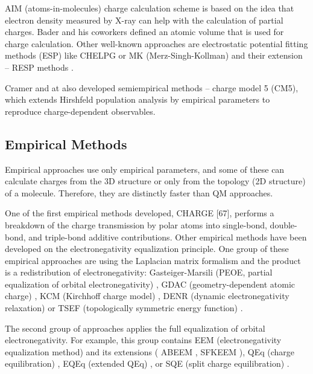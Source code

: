 AIM (atoms-in-molecules) charge calculation scheme is based on the idea that
electron density measured by X-ray can help with the calculation of partial
charges. Bader and his coworkers \cite{Bader1985, Bader1991} defined an atomic
volume that is used for charge calculation. Other well-known approaches are
electrostatic potential fitting methods (ESP) like CHELPG \cite{Breneman1990}
or MK (Merz-Singh-Kollman) \cite{Besler1990} and their extension -- RESP
methods \cite{Woods2015}.

Cramer and at \cite{Marenich2009} also developed semiempirical methods -- charge
model 5 (CM5), which extends Hirshfeld population analysis by empirical
parameters to reproduce charge-dependent observables. 

\subsection{Empirical Methods}

Empirical approaches use only empirical parameters, and some of these can
calculate charges from the 3D structure or only from the topology (2D structure)
of a molecule. Therefore, they are distinctly faster than QM approaches. 

One of the first empirical methods developed, CHARGE [67], performs a breakdown
of the charge transmission by polar atoms into single-bond, double-bond, and 
triple-bond additive contributions. Other empirical methods have been developed
on the electronegativity equalization principle. One group of these empirical
approaches are using the Laplacian matrix formalism and the product is
a redistribution of electronegativity: Gasteiger-Marsili (PEOE, partial
equalization of orbital electronegativity) \cite{Cho2001, Oliferenko2006},
GDAC (geometry-dependent atomic charge) \cite{Shulga2008}, KCM (Kirchhoff charge
model) \cite{Rappe1991}, DENR (dynamic electronegativity
relaxation) \cite{Nistor2006} or TSEF (topologically symmetric energy
function) \cite{Nistor2006}.


The second group of approaches applies the full equalization of orbital
electronegativity. For example, this group contains EEM (electronegativity
equalization method) \cite{Mortier1986} and its extensions (
ABEEM \cite{Wilmer2012}, SFKEEM \cite{Chaves2006}), QEq (charge
equilibration) \cite{Rappe1991}, EQEq (extended QEq) \cite{Wilmer2012}, or
SQE (split charge equilibration) \cite{Nistor2006}.

